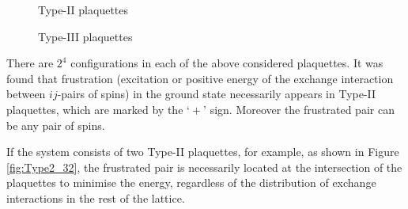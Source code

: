 \documentclass[utf8, babel, sor, jor, amsmath, amssymb, reprint]{elsarticle} %
\begin{document}
\begin{figure}[H]
\begin{minipage}{0.3\textwidth}
		\caption{Type-II plaquettes}
		\label{fig:Type2}
	\end{minipage}
	\hspace{5pt}
	\begin{minipage}{0.3\textwidth}
		\centering
		\hspace{-4pt} 
		\caption{Type-III plaquettes}
		\label{fig:Type3}
	\end{minipage}
\end{figure}


There are $2^4$ configurations in each of the above considered plaquettes.
It was found that frustration (excitation or positive energy of the exchange interaction between $ij$-pairs of spins) in the ground state necessarily appears in Type-II plaquettes, which are marked by the $‘+’$ sign. Moreover the frustrated pair can be any pair of spins.


If the system consists of two Type-II plaquettes, for example, as shown in Figure \ref{fig:Type2_32}, the frustrated pair is necessarily located at the intersection of the plaquettes to minimise the energy, regardless of the distribution of exchange interactions in the rest of the lattice. 
\end{document}
